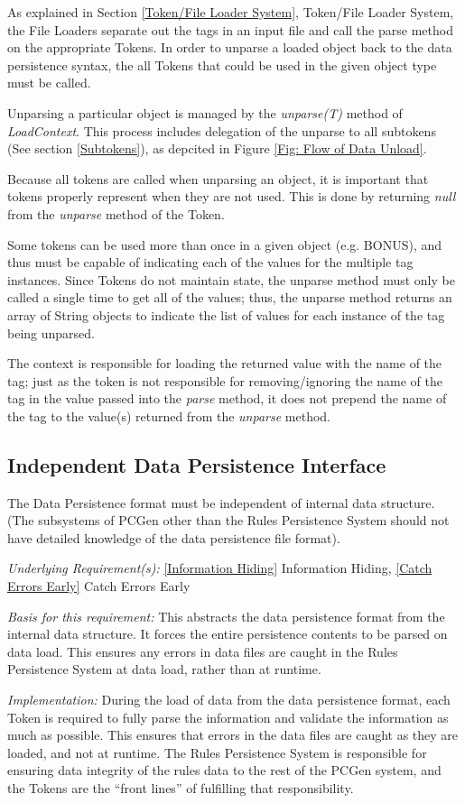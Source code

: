 \documentclass[12pt,letterpaper]{article}
\newcommand{\systemEOS}{Rules Persistence System}
\newcommand{\system}{\systemEOS{} }
\newcommand{\textem}[1]{\emph{#1}}
\newcommand{\lsubsection}[1]{\label{#1}\subsection{#1}}
\newcommand{\myref}[1]{\ref{#1} #1}
\newcommand{\basis}{\noindent\textem{Basis for this requirement:} }
\newcommand{\impl}{\noindent\textem{Implementation:} }
\newcommand{\under}{\noindent\textem{Underlying Requirement(s):} }
\begin{document}
As explained in Section \ref{Token/File Loader System}, Token/File Loader System, the File Loaders
separate out the tags in an input file and call the parse method on the appropriate
Tokens.  In order to unparse a loaded object back to the data persistence syntax, the 
all Tokens that could be used in the given object type must be called.

Unparsing a particular object is managed by the \textem{unparse(T)}
method of \textem{LoadContext}.  This process includes delegation of the unparse to all
subtokens (See section \ref{Subtokens}), as depcited in Figure \ref{Fig: Flow of Data Unload}. 

Because all tokens are called when unparsing an object, it is important that tokens 
properly represent when they are not used.  This is done by returning \textem{null} from
the \textem{unparse} method of the Token.  

Some tokens can be used more than once in a given object (e.g. BONUS), and thus must be 
capable of indicating each of the values for the multiple tag instances.  Since Tokens 
do not maintain state, the unparse method must only be called a single time to get all
of the values; thus, the unparse method returns an array of String objects to indicate 
the list of values for each instance of the tag being unparsed.

The context is responsible for loading the returned value with the name of the tag; 
just as the token is not responsible for removing/ignoring the name of the tag in
the value passed into the \textem{parse} method, it does not prepend the name of the tag
to the value(s) returned from the \textem{unparse} method.

\lsubsection{Independent Data Persistence Interface}

The Data Persistence format must be independent of internal data structure. (The subsystems of PCGen 
other than the \system should not have detailed knowledge of the data persistence file format).

\under \myref{Information Hiding}, \myref{Catch Errors Early}

\basis This abstracts the data persistence format from the internal data structure.  It forces the entire
persistence contents to be parsed on data load.  This ensures any errors in data files are
caught in the \system at data load, rather than at runtime.

\impl During the load of data from the data persistence format, each Token is required to 
fully parse the information and validate the information as much as possible.  This ensures 
that errors in the data files are caught as they are loaded, and not at runtime.  The \system
is responsible for ensuring data integrity of the rules data to the rest of the PCGen system, 
and the Tokens are the ``front lines'' of fulfilling that responsibility.
\end{document}
